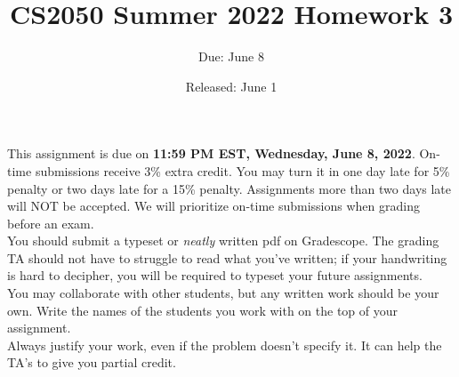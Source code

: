 \documentclass{article}
\title{CS2050 Summer 2022 Homework 3}
\author{Due: June 8}
\date{Released: June 1}
\begin{document}
\maketitle

This assignment is due on \textbf{11:59 PM EST, Wednesday, June 8, 2022}.  On-time submissions receive 3\% extra credit. You may turn it in one day late for 5\% penalty or two days late for a 15\% penalty. Assignments more than two days late will NOT be accepted.  We will prioritize on-time submissions when grading before an exam. \\ 

You should submit a typeset or \emph{neatly} written pdf on Gradescope.  The grading TA should not have to struggle to read what you've written; if your handwriting is hard to decipher, you will be required to typeset your future assignments.\\ 

You may collaborate with other students, but any written work should be your own. Write the names of the students you work with on the top of your assignment.\\

Always justify your work, even if the problem doesn't specify it. It can help the TA's to give you partial credit.
\end{document}
